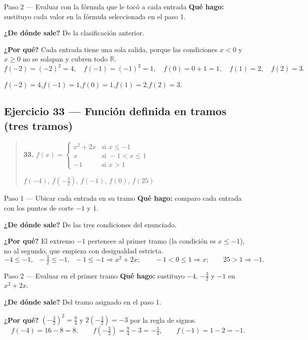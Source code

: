 \documentclass[11pt]{article}
\begin{document}
\begin{paso}{Paso 2 --- Evaluar con la fórmula que le tocó a cada entrada}
\textbf{Qué hago:} sustituyo cada valor en la fórmula seleccionada en el paso 1.

\textbf{¿De dónde sale?} De la clasificación anterior.

\textbf{¿Por qué?} Cada entrada tiene una sola salida, porque las condiciones $x<0$ y $x\ge0$ no se solapan y cubren todo $\mathbb{R}$.
\[
f(-2)=(-2)^2=4,\quad f(-1)=(-1)^2=1,\quad f(0)=0+1=1,\quad f(1)=2,\quad f(2)=3.
\]
\end{paso}

\begin{resp}
$f(-2)=4$,\quad $f(-1)=1$,\quad $f(0)=1$,\quad $f(1)=2$,\quad $f(2)=3$.
\end{resp}

\subsection*{Ejercicio 33 — Función definida en tramos (tres tramos)}

\begin{quote}
\textbf{33.} $f(x)=\begin{cases} x^2+2x & \text{si } x\le -1\\ x & \text{si } -1<x\le 1\\ -1 & \text{si } x>1\end{cases}$

\qquad $f(-4)$, $f\!\left(-\tfrac32\right)$, $f(-1)$, $f(0)$, $f(25)$
\end{quote}

\begin{paso}{Paso 1 --- Ubicar cada entrada en su tramo}
\textbf{Qué hago:} comparo cada entrada con los puntos de corte $-1$ y $1$.

\textbf{¿De dónde sale?} De las tres condiciones del enunciado.

\textbf{¿Por qué?} El extremo $-1$ pertenece al primer tramo (la condición es $x\le-1$), no al segundo, que empieza con desigualdad estricta.
\[
-4\le-1,\;\; -\tfrac32\le-1,\;\; -1\le-1 \Rightarrow x^2+2x;\qquad
-1<0\le1 \Rightarrow x;\qquad 25>1 \Rightarrow -1.
\]
\end{paso}

\begin{paso}{Paso 2 --- Evaluar en el primer tramo}
\textbf{Qué hago:} sustituyo $-4$, $-\tfrac32$ y $-1$ en $x^2+2x$.

\textbf{¿De dónde sale?} Del tramo asignado en el paso 1.

\textbf{¿Por qué?} $\left(-\tfrac32\right)^2=\tfrac94$ y $2\left(-\tfrac32\right)=-3$ por la regla de signos.
\[
f(-4)=16-8=8,\qquad f\!\left(-\tfrac32\right)=\tfrac94-3=-\tfrac34,\qquad f(-1)=1-2=-1.
\]
\end{paso}
\end{document}
